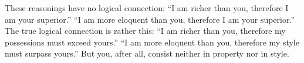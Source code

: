 These reasonings have no logical connection:  ``I am richer than you, therefore
I  am your  superior.'' ``I  am more  eloquent than  you, therefore  I am  your
superior.'' The true logical connection is rather this: ``I am richer than you,
therefore my  possessions must exceed yours.''  ``I am more eloquent  than you,
therefore my style must surpass yours.'' But you, after all, consist neither in
property nor in style.
